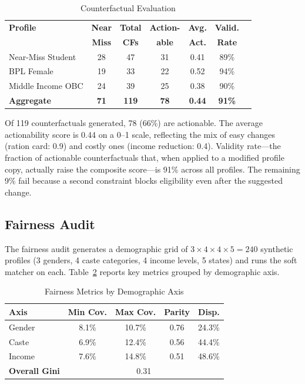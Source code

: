 \documentclass[conference]{IEEEtran}
\begin{document}
\begin{table}[t]
\centering
\caption{Counterfactual Evaluation}
\label{tab:cf}
\begin{tabular}{@{}lcccccc@{}}
\toprule
\textbf{Profile} & \textbf{Near} & \textbf{Total} & \textbf{Action-} & \textbf{Avg.} & \textbf{Valid.} \\
 & \textbf{Miss} & \textbf{CFs} & \textbf{able} & \textbf{Act.} & \textbf{Rate} \\
\midrule
Near-Miss Student & 28 & 47 & 31 & 0.41 & 89\% \\
BPL Female & 19 & 33 & 22 & 0.52 & 94\% \\
Middle Income OBC & 24 & 39 & 25 & 0.38 & 90\% \\
\midrule
\textbf{Aggregate} & \textbf{71} & \textbf{119} & \textbf{78} & \textbf{0.44} & \textbf{91\%} \\
\bottomrule
\end{tabular}
\end{table}

Of 119 counterfactuals generated, 78 (66\%) are actionable. The average actionability score is 0.44 on a 0--1 scale, reflecting the mix of easy changes (ration card: 0.9) and costly ones (income reduction: 0.4). Validity rate---the fraction of actionable counterfactuals that, when applied to a modified profile copy, actually raise the composite score---is 91\% across all profiles. The remaining 9\% fail because a second constraint blocks eligibility even after the suggested change.

\subsection{Fairness Audit}

The fairness audit generates a demographic grid of $3 \times 4 \times 4 \times 5 = 240$ synthetic profiles (3 genders, 4 caste categories, 4 income levels, 5 states) and runs the soft matcher on each. Table~\ref{tab:fairness} reports key metrics grouped by demographic axis.

\begin{table}[t]
\centering
\caption{Fairness Metrics by Demographic Axis}
\label{tab:fairness}
\begin{tabular}{@{}lcccc@{}}
\toprule
\textbf{Axis} & \textbf{Min Cov.} & \textbf{Max Cov.} & \textbf{Parity} & \textbf{Disp.} \\
\midrule
Gender & 8.1\% & 10.7\% & 0.76 & 24.3\% \\
Caste & 6.9\% & 12.4\% & 0.56 & 44.4\% \\
Income & 7.6\% & 14.8\% & 0.51 & 48.6\% \\
\midrule
\textbf{Overall Gini} & \multicolumn{4}{c}{0.31} \\
\bottomrule
\end{tabular}
\end{table}
\end{document}
